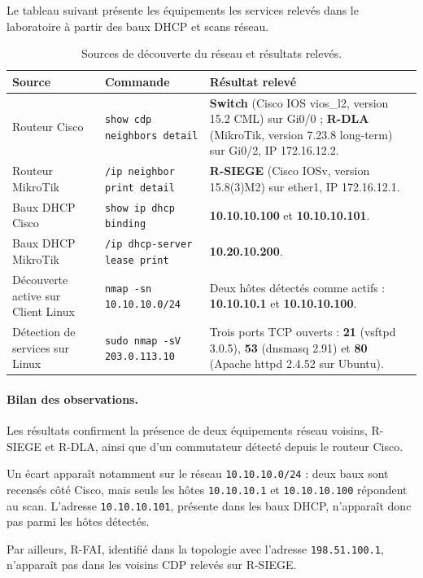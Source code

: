 \documentclass[11pt,a4paper]{article}
\begin{document}
	 Le tableau suivant présente les équipements les services relevés dans le laboratoire à partir des baux DHCP et scans réseau.
	
	\small
	\begin{longtable}{p{2.7cm} p{6.0cm} p{6.1cm}}
		\caption{Sources de découverte du réseau et résultats relevés.}\\
		\hline
		\textbf{Source} & \textbf{Commande} & \textbf{Résultat relevé}\\
		\hline
		\endhead
		Routeur Cisco & \texttt{show cdp neighbors detail} &  \textbf{Switch} (Cisco IOS vios\_l2, version 15.2 CML) sur Gi0/0 ; \textbf{R-DLA} (MikroTik, version 7.23.8 long-term) sur Gi0/2, IP 172.16.12.2.\\
		\hline
		Routeur MikroTik & \texttt{/ip neighbor print detail} & \textbf{R-SIEGE} (Cisco IOSv, version 15.8(3)M2) sur ether1, IP 172.16.12.1.\\
		\hline
		Baux DHCP Cisco & \texttt{show ip dhcp binding} & \textbf{10.10.10.100} et \textbf{10.10.10.101}.\\
		\hline
		Baux DHCP MikroTik & \texttt{/ip dhcp-server lease print} & \textbf{10.20.10.200}.\\
		\hline
		Découverte active sur Client Linux & \texttt{nmap -sn 10.10.10.0/24} & Deux hôtes détectés comme actifs : \textbf{10.10.10.1} et \textbf{10.10.10.100}.\\
		\hline
		Détection de services sur Linux & \texttt{sudo nmap -sV 203.0.113.10} & Trois ports TCP ouverts : \textbf{21} (vsftpd 3.0.5), \textbf{53} (dnsmasq 2.91) et \textbf{80} (Apache httpd 2.4.52 sur Ubuntu).\\
	\hline
	\end{longtable}
	\normalsize
	
	\paragraph{Bilan des observations.}
	
	Les résultats confirment la présence de deux équipements réseau voisins, R-SIEGE et R-DLA, ainsi que d'un commutateur détecté depuis le routeur Cisco.
	
	Un écart apparaît notamment sur le réseau \texttt{10.10.10.0/24} : deux baux sont recensés côté Cisco, mais seuls les hôtes \texttt{10.10.10.1} et \texttt{10.10.10.100} répondent au scan. L'adresse \texttt{10.10.10.101}, présente dans les baux DHCP, n'apparaît donc pas parmi les hôtes détectés.
	
	Par ailleurs, R-FAI, identifié dans la topologie avec l'adresse \texttt{198.51.100.1}, n'apparaît pas dans les voisins CDP relevés sur R-SIEGE.
	
\end{document}
